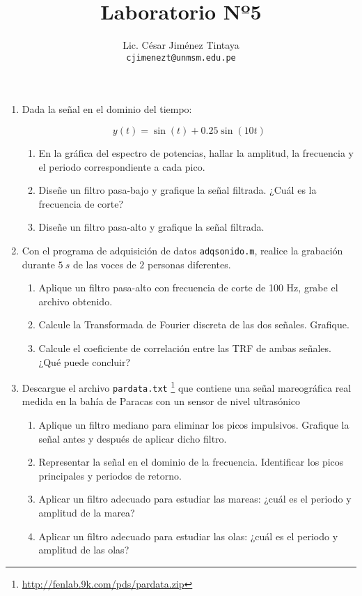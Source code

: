 \documentclass[a4paper,11pt,final]{article}
\begin{document}
  \title{Laboratorio Nº5}
  \author{Lic. César Jiménez Tintaya\\ \small{\texttt{cjimenezt@unmsm.edu.pe}}}
  \date{}
  \maketitle

  \begin{enumerate}
    \item Dada la señal en el dominio del tiempo:

      $$y\left(t\right) = \sin\left(t\right) + 0.25\sin\left(10t\right)$$

      \begin{enumerate}
        \item En la gráfica del espectro de potencias, hallar la amplitud,
              la frecuencia y el periodo correspondiente a cada pico.
        \item Diseñe un filtro pasa-bajo y grafique la señal filtrada.
              ¿Cuál es la frecuencia de corte?
        \item Diseñe un filtro pasa-alto y grafique la señal filtrada.
      \end{enumerate}

    \item Con el programa de adquisición de datos \texttt{adqsonido.m}, realice
      la grabación durante $5\ s$ de las voces de $2$ personas diferentes.

      \begin{enumerate}
        \item Aplique un filtro pasa-alto con frecuencia de corte de 100 Hz,
              grabe el archivo obtenido.
        \item Calcule la Transformada de Fourier discreta de las dos señales.
              Grafique.
        \item Calcule el coeficiente de correlación entre las TRF de ambas
              señales. ¿Qué puede concluir?
      \end{enumerate}

    \item Descargue el archivo \texttt{pardata.txt}
      \footnote{\url{http://fenlab.9k.com/pds/pardata.zip}} que contiene una
      señal mareográfica real medida en la bahía de Paracas con un sensor
      de nivel ultrasónico

      \begin{enumerate}
        \item Aplique un filtro mediano para eliminar los picos impulsivos. Grafique la señal antes y después de aplicar dicho filtro.
        \item Representar la señal en el dominio de la frecuencia. Identificar los picos principales y periodos de retorno.
        \item Aplicar un filtro adecuado para estudiar las mareas: ¿cuál es el periodo y amplitud de la marea?
        \item Aplicar un filtro adecuado para estudiar las olas: ¿cuál es el periodo y amplitud de las olas?
      \end{enumerate}


\end{enumerate}
\end{document}
